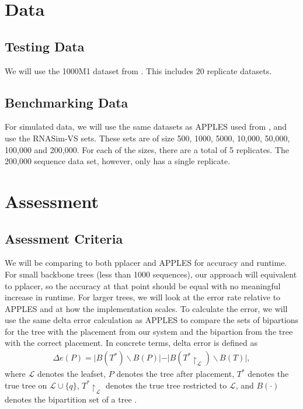 \documentclass[10pt]{article}
\begin{document}
\section{Data}

\subsection{Testing Data}

We will use the 1000M1 dataset from \cite{sate}. This includes 20 replicate
datasets.

\subsection{Benchmarking Data}

For simulated data, we will use the same datasets as APPLES used from
\cite{guo}, and use the RNASim-VS sets. These sets are of size 500, 1000,
5000, 10,000, 50,000, 100,000 and 200,000. For each of the sizes, there
are a total of 5 replicates. The 200,000 sequence data set, however,
only has a single replicate.

\section{Assessment}

\subsection{Asessment Criteria}

We will be comparing to both pplacer and APPLES for accuracy and
runtime. For small backbone trees (less than 1000 sequences), our
approach will equivalent to pplacer, so the accuracy at that point
should be equal with no meaningful increase in runtime. For larger
trees, we will look at the error rate relative to APPLES and at how the
implementation scales. To calculate the error, we will use the same
delta error calculation as APPLES to compare the sets of bipartions for
the tree with the placement from our system and the bipartion from the
tree with the correct placement. In concrete terms, delta error is
defined as
\begin{align*}
\Delta e(P) = \vert B(T^*) \backslash B(P) \vert - \vert B(T^* \upharpoonright_{\mathcal L}) \backslash B(T)\vert,
\end{align*}
where $\mathcal L$ denotes the leafset, \(P\) denotes the tree
after placement, $T^*$ denotes the true tree on
$\mathcal L \cup \{q\}$, $T^* \upharpoonright_{\mathcal L}$ denotes
the true tree restricted to $\mathcal L$, and $B(\cdot)$ denotes the
bipartition set of a tree \cite{balaban_apples_2020}.
\end{document}
